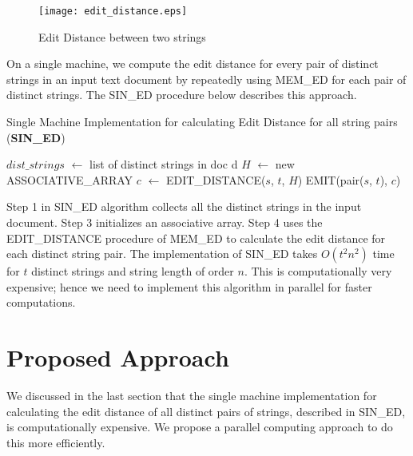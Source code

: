 \documentclass[conference]{IEEEtran}
\begin{document}
\begin{figure}[htbp]
\begin{center}
\texttt{[image: edit\_distance.eps]}
\end{center}
\caption{Edit Distance between two strings}
\label{fig:edit}
\end{figure}

On a single machine, we compute the edit distance for every pair of distinct strings in an input text document by repeatedly using MEM\_ED for each pair of distinct strings. The SIN\_ED procedure below describes this approach. 

\begin{algorithm}
\caption{Single Machine Implementation for calculating Edit Distance for all string pairs (\textbf{SIN\_ED})}
\begin{algorithmic}[1]
\State $dist\_strings$ $\leftarrow$ list of distinct strings in doc d
    \State $H$ $\leftarrow$ new ASSOCIATIVE\_ARRAY
    \State $c$ $\leftarrow$ EDIT\_DISTANCE($s$, $t$, $H$)
    \State EMIT(pair($s$, $t$), $c$)
\EndFor
\end{algorithmic}
\end{algorithm}

Step 1 in SIN\_ED algorithm collects all the distinct strings in the input document. Step 3 initializes an associative array. Step 4 uses the EDIT\_DISTANCE procedure of MEM\_ED to calculate the edit distance for each distinct string pair. The implementation of SIN\_ED takes $O(t^2n^2)$ time for $t$ distinct strings and string length of order $n$. This is computationally very expensive; hence we need to implement this algorithm in parallel for faster computations.

\section{Proposed Approach}
We discussed in the last section that the single machine implementation for calculating the edit distance of all distinct pairs of strings, described in SIN\_ED, is computationally expensive. We propose a parallel computing approach to do this more efficiently.
\end{document}
